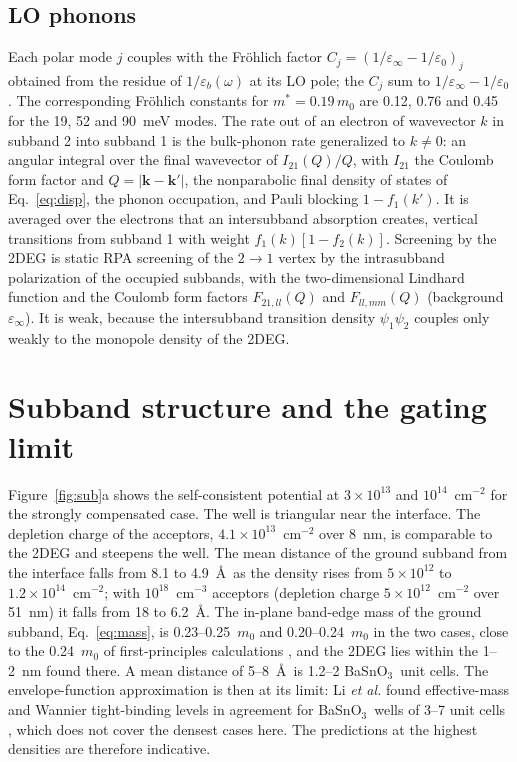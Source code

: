 \documentclass[11pt]{article}
\newcommand{\BSO}{BaSnO$_3$}
\begin{document}
\subsection{LO phonons}
Each polar mode $j$ couples with the Fr\"ohlich factor $C_j=(1/\varepsilon_\infty-1/\varepsilon_0)_j$ obtained from the residue of $1/\varepsilon_b(\omega)$ at its LO pole; the $C_j$ sum to $1/\varepsilon_\infty-1/\varepsilon_0$ \cite{Varga1965}. The corresponding Fr\"ohlich constants for $m^*=0.19\,m_0$ are 0.12, 0.76 and 0.45 for the 19, 52 and 90~meV modes. The rate out of an electron of wavevector $k$ in subband 2 into subband 1 is the bulk-phonon rate \cite{Ridley1982} generalized to $k\neq0$: an angular integral over the final wavevector of $I_{21}(Q)/Q$, with $I_{21}$ the Coulomb form factor and $Q=|\mathbf k-\mathbf k'|$, the nonparabolic final density of states of Eq.~\eqref{eq:disp}, the phonon occupation, and Pauli blocking $1-f_1(k')$. It is averaged over the electrons that an intersubband absorption creates, vertical transitions from subband 1 with weight $f_1(k)[1-f_2(k)]$. Screening by the 2DEG is static RPA screening of the $2\to1$ vertex by the intrasubband polarization of the occupied subbands, with the two-dimensional Lindhard function and the Coulomb form factors $F_{21,ll}(Q)$ and $F_{ll,mm}(Q)$ (background $\varepsilon_\infty$). It is weak, because the intersubband transition density $\psi_1\psi_2$ couples only weakly to the monopole density of the 2DEG.

\section{Subband structure and the gating limit}\label{sec:sub}
Figure~\ref{fig:sub}a shows the self-consistent potential at $3\times10^{13}$ and $10^{14}$~cm$^{-2}$ for the strongly compensated case. The well is triangular near the interface. The depletion charge of the acceptors, $4.1\times10^{13}$~cm$^{-2}$ over 8~nm, is comparable to the 2DEG and steepens the well. The mean distance of the ground subband from the interface falls from 8.1 to 4.9~\AA\ as the density rises from $5\times10^{12}$ to $1.2\times10^{14}$~cm$^{-2}$; with $10^{18}$~cm$^{-3}$ acceptors (depletion charge $5\times10^{12}$~cm$^{-2}$ over 51~nm) it falls from 18 to 6.2~\AA. The in-plane band-edge mass of the ground subband, Eq.~\eqref{eq:mass}, is 0.23--0.25~$m_0$ and 0.20--0.24~$m_0$ in the two cases, close to the 0.24~$m_0$ of first-principles calculations \cite{Aggoune2021}, and the 2DEG lies within the 1--2~nm found there. A mean distance of 5--8~\AA\ is 1.2--2 \BSO\ unit cells. The envelope-function approximation is then at its limit: Li \emph{et al.} found effective-mass and Wannier tight-binding levels in agreement for \BSO\ wells of 3--7 unit cells \cite{Li2021BSO}, which does not cover the densest cases here. The predictions at the highest densities are therefore indicative.
\end{document}
